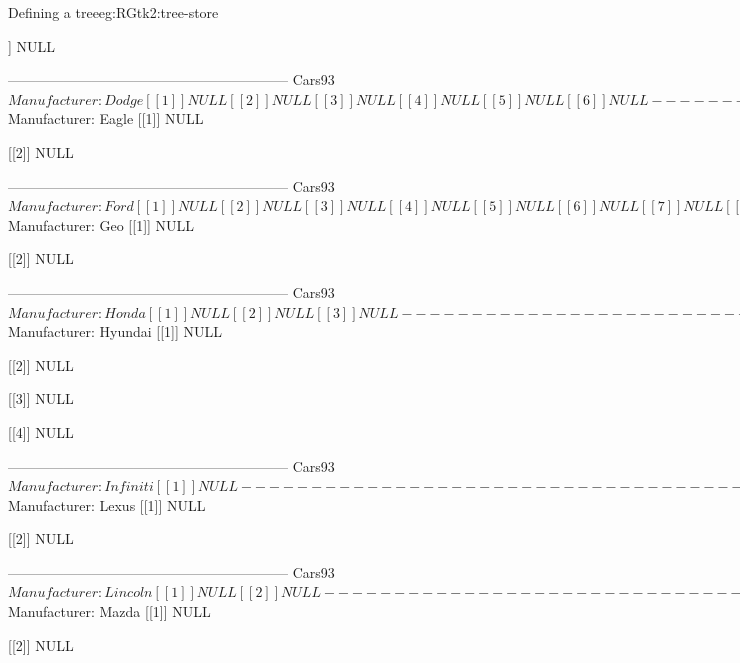 \begin{example}{Defining a tree}{eg:RGtk2:tree-store}
\begin{Schunk}
\begin{Soutput}
[[2]]
NULL

------------------------------------------------------------ 
Cars93$Manufacturer: Dodge
[[1]]
NULL

[[2]]
NULL

[[3]]
NULL

[[4]]
NULL

[[5]]
NULL

[[6]]
NULL

------------------------------------------------------------ 
Cars93$Manufacturer: Eagle
[[1]]
NULL

[[2]]
NULL

------------------------------------------------------------ 
Cars93$Manufacturer: Ford
[[1]]
NULL

[[2]]
NULL

[[3]]
NULL

[[4]]
NULL

[[5]]
NULL

[[6]]
NULL

[[7]]
NULL

[[8]]
NULL

------------------------------------------------------------ 
Cars93$Manufacturer: Geo
[[1]]
NULL

[[2]]
NULL

------------------------------------------------------------ 
Cars93$Manufacturer: Honda
[[1]]
NULL

[[2]]
NULL

[[3]]
NULL

------------------------------------------------------------ 
Cars93$Manufacturer: Hyundai
[[1]]
NULL

[[2]]
NULL

[[3]]
NULL

[[4]]
NULL

------------------------------------------------------------ 
Cars93$Manufacturer: Infiniti
[[1]]
NULL

------------------------------------------------------------ 
Cars93$Manufacturer: Lexus
[[1]]
NULL

[[2]]
NULL

------------------------------------------------------------ 
Cars93$Manufacturer: Lincoln
[[1]]
NULL

[[2]]
NULL

------------------------------------------------------------ 
Cars93$Manufacturer: Mazda
[[1]]
NULL

[[2]]
NULL


\end{Soutput}
\end{Schunk}
\end{example}
